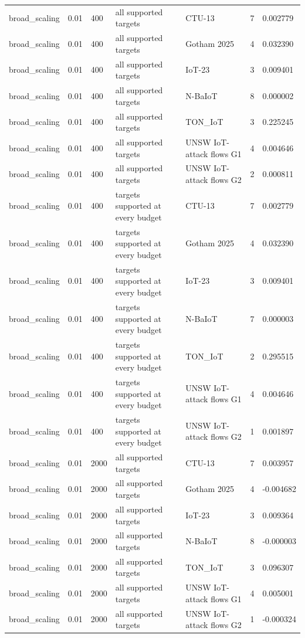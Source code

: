 \begin{tabular}{lllllll}
broad\_scaling & 0.01 & 400 & all supported targets & CTU-13 & 7 & 0.002779 \\
broad\_scaling & 0.01 & 400 & all supported targets & Gotham 2025 & 4 & 0.032390 \\
broad\_scaling & 0.01 & 400 & all supported targets & IoT-23 & 3 & 0.009401 \\
broad\_scaling & 0.01 & 400 & all supported targets & N-BaIoT & 8 & 0.000002 \\
broad\_scaling & 0.01 & 400 & all supported targets & TON\_IoT & 3 & 0.225245 \\
broad\_scaling & 0.01 & 400 & all supported targets & UNSW IoT-attack flows G1 & 4 & 0.004646 \\
broad\_scaling & 0.01 & 400 & all supported targets & UNSW IoT-attack flows G2 & 2 & 0.000811 \\
broad\_scaling & 0.01 & 400 & targets supported at every budget & CTU-13 & 7 & 0.002779 \\
broad\_scaling & 0.01 & 400 & targets supported at every budget & Gotham 2025 & 4 & 0.032390 \\
broad\_scaling & 0.01 & 400 & targets supported at every budget & IoT-23 & 3 & 0.009401 \\
broad\_scaling & 0.01 & 400 & targets supported at every budget & N-BaIoT & 7 & 0.000003 \\
broad\_scaling & 0.01 & 400 & targets supported at every budget & TON\_IoT & 2 & 0.295515 \\
broad\_scaling & 0.01 & 400 & targets supported at every budget & UNSW IoT-attack flows G1 & 4 & 0.004646 \\
broad\_scaling & 0.01 & 400 & targets supported at every budget & UNSW IoT-attack flows G2 & 1 & 0.001897 \\
broad\_scaling & 0.01 & 2000 & all supported targets & CTU-13 & 7 & 0.003957 \\
broad\_scaling & 0.01 & 2000 & all supported targets & Gotham 2025 & 4 & -0.004682 \\
broad\_scaling & 0.01 & 2000 & all supported targets & IoT-23 & 3 & 0.009364 \\
broad\_scaling & 0.01 & 2000 & all supported targets & N-BaIoT & 8 & -0.000003 \\
broad\_scaling & 0.01 & 2000 & all supported targets & TON\_IoT & 3 & 0.096307 \\
broad\_scaling & 0.01 & 2000 & all supported targets & UNSW IoT-attack flows G1 & 4 & 0.005001 \\
broad\_scaling & 0.01 & 2000 & all supported targets & UNSW IoT-attack flows G2 & 1 & -0.000324 \\

\end{tabular}
